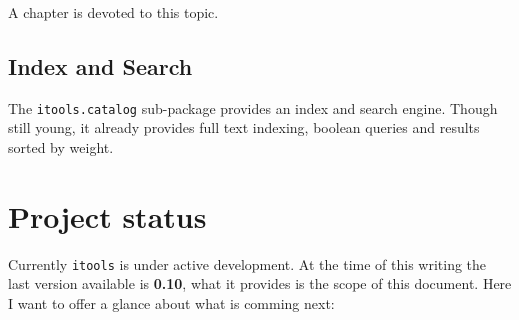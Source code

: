 A chapter is devoted to this topic.


\subsection{Index and Search}

The {\tt itools.catalog} sub-package provides an index and search engine.
Though still young, it already provides full text indexing, boolean queries
and results sorted by weight.


\section{Project status}

Currently {\tt itools} is under active development. At the time of this
writing the last version available is {\bf 0.10}, what it provides is
the scope of this document. Here I want to offer a glance about what is
comming next:

